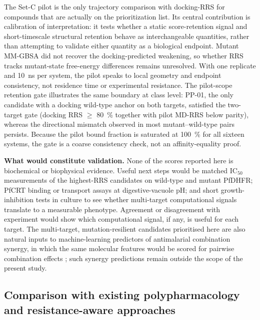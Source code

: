 \documentclass[journal=jcisd8,manuscript=article,layout=traditional]{achemso}
\begin{document}
The Set-C pilot is the only trajectory comparison with docking-RRS for compounds that are actually on the prioritization list. Its central contribution is calibration of interpretation: it tests whether a static score-retention signal and short-timescale structural retention behave as interchangeable quantities, rather than attempting to validate either quantity as a biological endpoint. Mutant MM-GBSA did not recover the docking-predicted weakening, so whether RRS tracks mutant-state free-energy differences remains unresolved. With one replicate and 10~ns per system, the pilot speaks to local geometry and endpoint consistency, not residence time or experimental resistance. The pilot-scope retention gate illustrates the same boundary at class level: PP-01, the only candidate with a docking wild-type anchor on both targets, satisfied the two-target gate (docking RRS $\geq$ \qty{80}{\percent} together with pilot MD-RRS below parity), whereas the directional mismatch observed in most mutant--wild-type pairs persists. Because the pilot bound fraction is saturated at \qty{100}{\percent} for all sixteen systems, the gate is a coarse consistency check, not an affinity-equality proof.

\textbf{What would constitute validation.}
None of the scores reported here is biochemical or biophysical evidence. Useful next steps would be matched IC$_{50}$ measurements of the highest-RRS candidates on wild-type and mutant PfDHFR; PfCRT binding or transport assays at digestive-vacuole pH; and short growth-inhibition tests in culture to see whether multi-target computational signals translate to a measurable phenotype. Agreement or disagreement with experiment would show which computational signal, if any, is useful for each target. The multi-target, mutation-resilient candidates prioritised here are also natural inputs to machine-learning predictors of antimalarial combination synergy, in which the same molecular features would be scored for pairwise combination effects \citep{mlsypredc2024}; such synergy predictions remain outside the scope of the present study.

\subsection{Comparison with existing polypharmacology and resistance-aware approaches}
\end{document}
